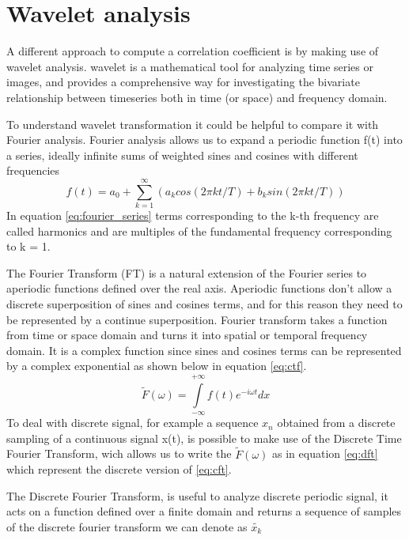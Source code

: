 \documentclass[11pt]{report}
\begin{document}
\section{Wavelet analysis}
A different approach to compute a correlation coefficient is by making use of wavelet analysis.\cite{ferrante-2015} \cite{vandenberg-1999}
wavelet is a mathematical tool for analyzing time series or images, and provides a comprehensive way for investigating the bivariate relationship between timeseries both in time (or space) and frequency domain.

To understand wavelet transformation it could be helpful to compare it with Fourier analysis.
Fourier analysis allows us to expand a periodic function f(t) into a series, ideally infinite sums of weighted sines and cosines with different frequencies
\begin{equation}\label{eq:fourier_series}
f(t) = a_0 + \sum_{k = 1}^\infty (a_k cos(2\pi k t/T) + b_k sin (2\pi k t /T))
\end{equation}
In equation \ref{eq:fourier_series} terms corresponding to the k-th frequency are called harmonics and are multiples of the fundamental frequency corresponding to k = 1.

The Fourier Transform (FT) is a natural extension of the Fourier series to aperiodic functions defined over the real axis.
Aperiodic functions don't allow a discrete superposition of sines and cosines terms, and for this reason they need to be represented by a continue superposition.
Fourier transform takes a function from time or space domain and turns it into spatial or temporal frequency domain.
It is a complex function since sines and cosines terms can be represented by a complex exponential as shown below in equation \ref{eq:ctf}.
\begin{equation}\label{eq:cft}
\tilde{F}(\omega) = \int\limits_{-\infty}^{+\infty} f(t)e^{-i \omega t} dx
\end{equation}
To deal with discrete signal, for example a sequence $x_n$ obtained from a discrete sampling of a continuous signal x(t), is possible to make use of the Discrete Time Fourier Transform, wich allows us to write the $\tilde F(\omega)$ as in equation \ref{eq:dft} which represent the discrete version of \ref{eq:cft}.

The Discrete Fourier Transform, is useful to analyze discrete periodic signal, it acts on a function defined over a finite domain and returns a sequence of samples of the discrete fourier transform we can denote as $\tilde{x_k}$
\end{document}
